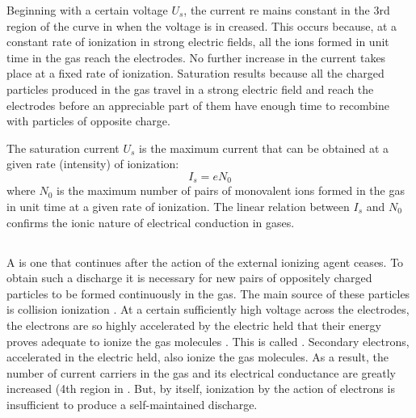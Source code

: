 Beginning with a certain voltage $U_{s}$, the current re­ mains constant in the 3rd
region of the curve in  when the voltage is in­ creased. This occurs because, at a constant rate of ionization  in strong electric fields, all the ions formed in unit time in the gas reach the electrodes. No further increase in the current takes place at a fixed rate of ionization. Saturation results because all the charged particles produced in the gas travel in a strong electric field and reach the electrodes before an appreciable part of them have enough time to recombine with particles of opposite charge.

The saturation current $U_{s}$ is the maximum current that can be obtained at a given rate (intensity) of ionization:
\begin{equation*}%
I_{s} = eN_{0}
\end{equation*}
where $N_{0}$ is the maximum number of pairs of monovalent ions formed in the gas in unit time at a given rate of ionization. The linear relation between $I_{s}$ and $N_{0}$ confirms the ionic nature of electrical conduction in gases.

\subsection{}\label{22.5.3} A  is one that continues after the action of the external ionizing agent ceases. To obtain such a discharge it is necessary for new pairs of oppositely charged particles to be formed continuously in the gas. The main source of these particles is collision ionization . At a certain sufficiently high voltage across the electrodes, the electrons are so highly accelerated by the electric held that their energy proves adequate to ionize the gas molecules . This is called . Secondary electrons, accelerated in the electric held, also ionize the gas molecules. As a result, the number of current carriers in the gas and its electrical conductance are greatly increased (4th region in . But, by itself, ionization by the action of electrons is insufficient to produce a self-maintained discharge. 

